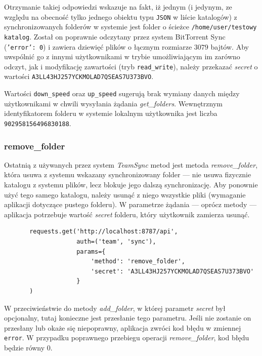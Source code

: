 Otrzymanie takiej odpowiedzi wskazuje na fakt, iż jednym (i jedynym, ze względu na obecność tylko jednego obiektu typu \texttt{JSON} w liście katalogów) z synchronizowanych folderów w systemie jest folder o ścieżce \texttt{/home/user\-/testowy katalog}. Został on poprawnie odczytany przez system BitTorrent Sync (\texttt{'error': 0}) i zawiera dziewięć plików o łącznym rozmiarze $3079$ bajtów. Aby uwspólnić go z innymi użytkownikami w trybie umożliwiającym im zarówno odczyt, jak i modyfikację zawartości (tryb \texttt{read\_write}), należy przekazać \emph{secret} o wartości \texttt{A3LL43HJ\-257YCKMO\-LAD7QSEAS\-7U373BVO}.

Wartości \texttt{down\_speed} oraz \texttt{up\_speed} sugerują brak wymiany danych między użytkownikami w chwili wysyłania żądania \emph{get\_folders}. Wewnętrznym identyfikatorem folderu w systemie lokalnym użytkownika jest liczba \texttt{902958156496830188}.

\subsubsection*{remove\_folder}

Ostatnią z używanych przez system \emph{TeamSync} metod jest metoda \emph{remove\_folder}, która usuwa z systemu wskazany synchronizowany folder --- nie usuwa fizycznie katalogu z systemu plików, lecz blokuje jego dalszą synchronizację. Aby ponownie użyć tego samego katalogu, należy usunąć z niego wszystkie pliki (wymaganie aplikacji dotyczące pustego folderu). W parametrze żądania --- oprócz metody --- aplikacja potrzebuje wartość \emph{secret} folderu, który użytkownik zamierza usunąć.

\begin{minipage}{\linewidth}
\vspace{15pt}
\begin{verbatim}
       requests.get('http://localhost:8787/api',
                    auth=('team', 'sync'),
                    params={
                        'method': 'remove_folder',
                        'secret': 'A3LL43HJ257YCKMOLAD7QSEAS7U373BVO'
                    }
       )
\end{verbatim}
\vspace{15pt}
\end{minipage}

W przeciwieństwie do metody \emph{add\_folder}, w której parametr \emph{secret} był opcjonalny, tutaj konieczne jest przesłanie tego parametru. Jeśli nie zostanie on przesłany lub okaże się niepoprawny, aplikacja zwróci kod błędu w zmiennej \texttt{error}. W przypadku poprawnego przebiegu operacji \emph{remove\_folder}, kod błędu będzie równy $0$.

